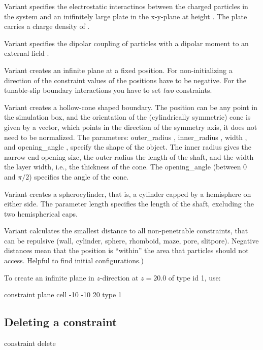 Variant  specifies the electrostatic interactinos between
the charged particles in the system and an inifinitely large plate in
the x-y-plane at height . The plate carries a charge density of
.
  
Variant  specifies the dipolar coupling of particles with a
dipolar moment to an external field   .

Variant  creates an infinite plane at a fixed position. For
non-initializing a direction of the constraint values of the positions
have to be negative. For the tunable-slip boundary interactions you
have to set \emph{two} constraints.

Variant  creates a hollow-cone shaped boundary. The position can be any point in the simulation
box, and the orientation of the (cylindrically symmetric) cone is
given by a vector, which points in the direction of the symmetry axis, it
does not need to be normalized. The parameters: outer_radius ,
inner_radius , width , and opening_angle , specify the shape of the object. The inner radius gives the narrow end opening size, the outer radius the length of the shaft, and the width the layer width, i.e., the thickness of the cone. The opening_angle (between 0 and $\pi/2$) specifies the angle of the cone. 

Variant  creates a spherocylinder, that is, a cylinder capped by a hemisphere on either side. The parameter length  specifies the length of the shaft, excluding the two hemispherical caps. 

Variant  calculates the smallest distance to all non-penetrable
constraints, that can be repulsive (wall, cylinder, sphere, rhomboid, maze, pore, slitpore).
Negative distances mean that the position is ``within'' the area that
particles should not access. Helpful to find initial configurations.) 

To create an infinite plane in $z$-direction at $z=20.0$ of type id 1,
use:
\begin{code}
  constraint plane cell -10 -10 20 type 1
\end{code}

\subsection{Deleting a constraint}
\begin{essyntax}
  constraint delete  
\end{essyntax}


